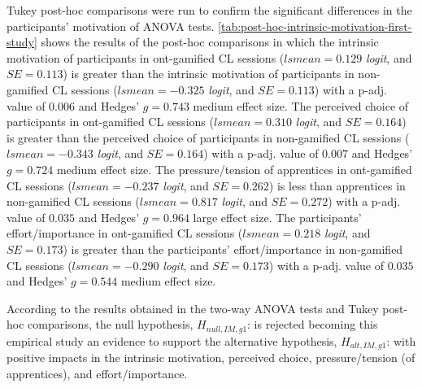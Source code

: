 Tukey post-hoc comparisons were run to confirm the significant differences in the participants' motivation of ANOVA tests. \autoref{tab:post-hoc-intrinsic-motivation-first-study} shows the results of the post-hoc comparisons in which the intrinsic motivation of participants in ont-gamified CL sessions ($lsmean=0.129$ \emph{logit}, and $SE = 0.113$) is greater than the intrinsic motivation of participants in non-gamified CL sessions ($lsmean=-0.325$ \emph{logit}, and $SE = 0.113$) with a p-adj. value of $0.006$ and Hedges' $g=0.743$ medium effect size. The perceived choice of participants in ont-gamified CL sessions ($lsmean=0.310$ \emph{logit}, and $SE = 0.164$) is greater than the perceived choice of participants in non-gamified CL sessions ($lsmean=-0.343$ \emph{logit}, and $SE = 0.164$) with a p-adj. value of $0.007$ and Hedges' $g=0.724$ medium effect size. The pressure/tension of apprentices in ont-gamified CL sessions ($lsmean=-0.237$ \emph{logit}, and $SE = 0.262$) is less than apprentices in non-gamified CL sessions ($lsmean=0.817$ \emph{logit}, and $SE = 0.272$) with a p-adj. value of $0.035$ and Hedges' $g=0.964$ large effect size. The participants' effort/importance in ont-gamified CL sessions ($lsmean=0.218$ \emph{logit}, and $SE = 0.173$) is greater than the participants' effort/importance in non-gamified CL sessions ($lsmean=-0.290$ \emph{logit}, and $SE = 0.173$) with a p-adj. value of $0.035$ and Hedges' $g=0.544$ medium effect size.

According to the results obtained in the two-way ANOVA tests and Tukey post-hoc comparisons, the null hypothesis, $H_{null,IM,g1}$:  is rejected becoming this empirical study an evidence to support the alternative hypothesis, $H_{alt,IM,g1}$:  with positive impacts in the intrinsic motivation, perceived choice, pressure/tension (of apprentices), and effort/importance.

